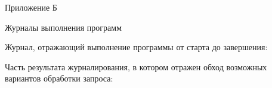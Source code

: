\newpage\centerline{Приложение Б}
\centerline{Журналы выполнения программ}

Журнал, отражающий выполнение программы от старта до завершения:


\newpage
Часть результата журналирования, в котором отражен обход возможных вариантов обработки запроса:

